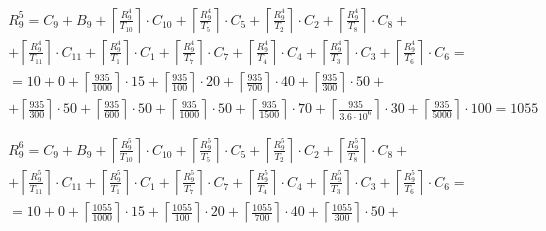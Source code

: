 \begin{gather*}
  \begin{multlined}
    R_9^5 = C_9 + B_9 + \left\lceil\frac{R_9^4}{T_{10}}\right\rceil\cdot C_{10} + %
    \left\lceil\frac{R_9^4}{T_5}\right\rceil\cdot C_5 + %
    \left\lceil\frac{R_9^4}{T_2}\right\rceil\cdot C_2 + %
    \left\lceil\frac{R_9^4}{T_8}\right\rceil\cdot C_8 + \\%
    + \left\lceil\frac{R_9^4}{T_{11}}\right\rceil\cdot C_{11} + %
    \left\lceil\frac{R_9^4}{T_1}\right\rceil\cdot C_1 +%
    \left\lceil\frac{R_9^4}{T_7}\right\rceil\cdot C_7 +%
    \left\lceil\frac{R_9^4}{T_4}\right\rceil\cdot C_4 +%
    \left\lceil\frac{R_9^4}{T_3}\right\rceil\cdot C_3 +%
    \left\lceil\frac{R_9^4}{T_6}\right\rceil\cdot C_6 = \\%
    = 10 + 0 + \left\lceil\frac{935}{1000}\right\rceil\cdot 15 + %
    \left\lceil\frac{935}{100}\right\rceil\cdot 20 + %
    \left\lceil\frac{935}{700}\right\rceil\cdot 40 + %
    \left\lceil\frac{935}{300}\right\rceil\cdot 50 + \\%
    + \left\lceil\frac{935}{300}\right\rceil\cdot 50 + %
    \left\lceil\frac{935}{600}\right\rceil\cdot 50 + %
    \left\lceil\frac{935}{1000}\right\rceil\cdot 50 +%
    \left\lceil\frac{935}{1500}\right\rceil\cdot 70 +%
    \left\lceil\frac{935}{3.6 \cdot 10^6}\right\rceil\cdot 30 +%
    \left\lceil\frac{935}{5000}\right\rceil\cdot 100 = 1055 \\
  \end{multlined} \\
  \begin{multlined}
    R_9^6 = C_9 + B_9 + \left\lceil\frac{R_9^5}{T_{10}}\right\rceil\cdot C_{10} + %
    \left\lceil\frac{R_9^5}{T_5}\right\rceil\cdot C_5 + %
    \left\lceil\frac{R_9^5}{T_2}\right\rceil\cdot C_2 + %
    \left\lceil\frac{R_9^5}{T_8}\right\rceil\cdot C_8 + \\%
    + \left\lceil\frac{R_9^5}{T_{11}}\right\rceil\cdot C_{11} + %
    \left\lceil\frac{R_9^5}{T_1}\right\rceil\cdot C_1 +%
    \left\lceil\frac{R_9^5}{T_7}\right\rceil\cdot C_7 +%
    \left\lceil\frac{R_9^5}{T_4}\right\rceil\cdot C_4 +%
    \left\lceil\frac{R_9^5}{T_3}\right\rceil\cdot C_3 +%
    \left\lceil\frac{R_9^5}{T_6}\right\rceil\cdot C_6 = \\%
    = 10 + 0 + \left\lceil\frac{1055}{1000}\right\rceil\cdot 15 + %
    \left\lceil\frac{1055}{100}\right\rceil\cdot 20 + %
    \left\lceil\frac{1055}{700}\right\rceil\cdot 40 + %
    \left\lceil\frac{1055}{300}\right\rceil\cdot 50 + \\%

\end{multlined}
\end{gather*}
